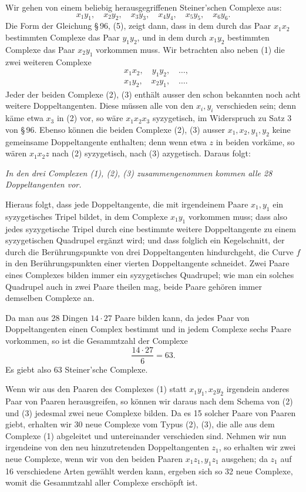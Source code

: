 \documentclass[11pt]{article}
\begin{document}
Wir gehen von einem beliebig herausgegriffenen Steiner'schen Complexe aus:
\begin{equation}
 x_1y_1,\quad x_2y_2,\quad x_3y_3,\quad x_4y_4,\quad x_5y_5,\quad x_6y_6.
 \tag{1}
\end{equation}
Die Form der Gleichung \S\,96, (5), zeigt dann, dass in dem durch das Paar \(x_1x_2\) bestimmten Complexe das Paar \(y_1y_2\), und in dem durch \(x_1y_2\) bestimmten Complexe das Paar \(x_2y_1\) vorkommen muss. Wir betrachten also neben (1) die zwei weiteren Complexe
\begin{align}
&x_1x_2,\quad y_1y_2,\quad \ldots, \tag{2}\\
&x_1y_2,\quad x_2y_1,\quad \ldots. \tag{3}
\end{align}
Jeder der beiden Complexe (2), (3) enthält ausser den schon bekannten noch acht weitere Doppeltangenten. Diese müssen alle von den \(x_i,y_i\) verschieden sein; denn käme etwa \(x_3\) in (2) vor, so wäre \(x_1x_2x_3\) syzygetisch, im Widerspruch zu Satz 3 von \S\,96. Ebenso können die beiden Complexe (2), (3) ausser \(x_1,x_2,y_1,y_2\) keine gemeinsame Doppeltangente enthalten; denn wenn etwa \(z\) in beiden vorkäme, so wären \(x_1x_2z\) nach (2) syzygetisch, nach (3) azygetisch. Daraus folgt:

\emph{In den drei Complexen (1), (2), (3) zusammengenommen kommen alle 28 Doppeltangenten vor.}

Hieraus folgt, dass jede Doppeltangente, die mit irgendeinem Paare \(x_1,y_1\) ein syzygetisches Tripel bildet, in dem Complexe \(x_1y_1\) vorkommen muss; dass also jedes syzygetische Tripel durch eine bestimmte weitere Doppeltangente zu einem syzygetischen Quadrupel ergänzt wird; und dass folglich ein Kegelschnitt, der durch die Berührungspunkte von drei Doppeltangenten hindurchgeht, die Curve \(f\) in den Berührungspunkten einer vierten Doppeltangente schneidet. Zwei Paare eines Complexes bilden immer ein syzygetisches Quadrupel; wie man ein solches Quadrupel auch in zwei Paare theilen mag, beide Paare gehören immer demselben Complexe an.

Da man aus 28 Dingen \(14\cdot27\) Paare bilden kann, da jedes Paar von Doppeltangenten einen Complex bestimmt und in jedem Complexe sechs Paare vorkommen, so ist die Gesammtzahl der Complexe
\[
 \frac{14\cdot27}{6}=63.
\]
Es giebt also 63 Steiner'sche Complexe.

Wenn wir aus den Paaren des Complexes (1) statt \(x_1y_1,x_2y_2\) irgendein anderes Paar von Paaren herausgreifen, so können wir daraus nach dem Schema von (2) und (3) jedesmal zwei neue Complexe bilden. Da es 15 solcher Paare von Paaren giebt, erhalten wir 30 neue Complexe vom Typus (2), (3), die alle aus dem Complexe (1) abgeleitet und untereinander verschieden sind. Nehmen wir nun irgendeine von den neu hinzutretenden Doppeltangenten \(z_1\), so erhalten wir zwei neue Complexe, wenn wir von den beiden Paaren \(x_1z_1,y_1z_1\) ausgehen; da \(z_1\) auf 16 verschiedene Arten gewählt werden kann, ergeben sich so 32 neue Complexe, womit die Gesammtzahl aller Complexe erschöpft ist.
\end{document}
